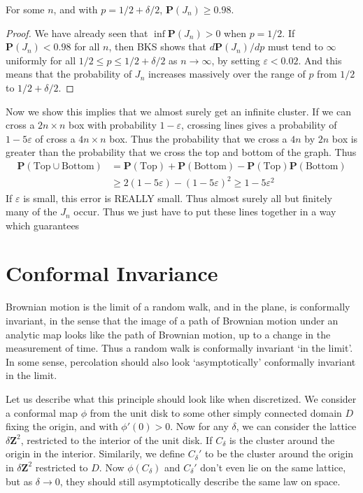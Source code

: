 \begin{lemma}
    For some $n$, and with $p = 1/2 + \delta/2$, $\mathbf{P}(J_n) \geq 0.98$.
\end{lemma}
\begin{proof}
    We have already seen that $\inf \mathbf{P}(J_n) > 0$ when $p = 1/2$. If $\mathbf{P}(J_n) < 0.98$ for all $n$, then BKS shows that $d\mathbf{P}(J_n)/dp$ must tend to $\infty$ uniformly for all $1/2 \leq p \leq 1/2 + \delta/2$ as $n \to \infty$, by setting $\varepsilon < 0.02$. And this means that the probability of $J_n$ increases massively over the range of $p$ from $1/2$ to $1/2 + \delta/2$.
\end{proof}

Now we show this implies that we almost surely get an infinite cluster. If we can cross a $2n \times n$ box with probability $1 - \varepsilon$, crossing lines gives a probability of $1 - 5 \varepsilon$ of cross a $4n \times n$ box. Thus the probability that we cross a $4n$ by $2n$ box is greater than the probability that we cross the top and bottom of the graph. Thus
%
\begin{align*}
    \mathbf{P}(\text{Top} \cup \text{Bottom}) &= \mathbf{P}(\text{Top}) + \mathbf{P}(\text{Bottom}) - \mathbf{P}(\text{Top}) \mathbf{P}(\text{Bottom})\\
    &\geq 2(1 - 5\varepsilon) - (1 - 5\varepsilon)^2 \geq 1 - 5 \varepsilon^2
\end{align*}
%
If $\varepsilon$ is small, this error is REALLY small. Thus almost surely all but finitely many of the $J_n$ occur. Thus we just have to put these lines together in a way which guarantees

\section{Conformal Invariance}

Brownian motion is the limit of a random walk, and in the plane, is conformally invariant, in the sense that the image of a path of Brownian motion under an analytic map looks like the path of Brownian motion, up to a change in the measurement of time. Thus a random walk is conformally invariant `in the limit'. In some sense, percolation should also look `asymptotically' conformally invariant in the limit.

Let us describe what this principle should look like when discretized. We consider a conformal map $\phi$ from the unit disk to some other simply connected domain $D$ fixing the origin, and with $\phi'(0) > 0$. Now for any $\delta$, we can consider the lattice $\delta \mathbf{Z}^2$, restricted to the interior of the unit disk. If $C_\delta$ is the cluster around the origin in the interior. Similarily, we define $C_\delta'$ to be the cluster around the origin in $\delta \mathbf{Z}^2$ restricted to $D$. Now $\phi(C_\delta)$ and $C_\delta'$ don't even lie on the same lattice, but as $\delta \to 0$, they should still asymptotically describe the same law on space.

